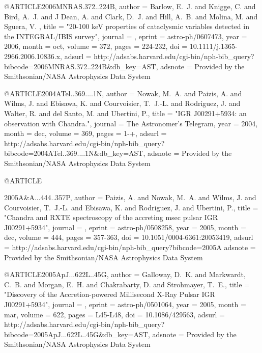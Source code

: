 {{{@ARTICLE{2006MNRAS.372..224B,
   author = {{Barlow}, E.~J. and {Knigge}, C. and {Bird}, A.~J. and {J Dean}, A. and 
	{Clark}, D.~J. and {Hill}, A.~B. and {Molina}, M. and {Sguera}, V.
	},
    title = "{20-100 keV properties of cataclysmic variables detected in the INTEGRAL/IBIS survey}",
  journal = {\mnras},
   eprint = {astro-ph/0607473},
     year = 2006,
    month = oct,
   volume = 372,
    pages = {224-232},
      doi = {10.1111/j.1365-2966.2006.10836.x},
   adsurl = {http://adsabs.harvard.edu/cgi-bin/nph-bib_query?bibcode=2006MNRAS.372..224B&db_key=AST},
  adsnote = {Provided by the Smithsonian/NASA Astrophysics Data System}
}



@ARTICLE{2004ATel..369....1N,
   author = {{Nowak}, M.~A. and {Paizis}, A. and {Wilms}, J. and {Ebisawa}, K. and 
	{Courvoisier}, T.~J.-L. and {Rodriguez}, J. and {Walter}, R. and 
	{del Santo}, M. and {Ubertini}, P.},
    title = "{IGR J00291+5934: an observation with Chandra.}",
  journal = {The Astronomer's Telegram},
     year = 2004,
    month = dec,
   volume = 369,
    pages = {1-+},
   adsurl = {http://adsabs.harvard.edu/cgi-bin/nph-bib_query?bibcode=2004ATel..369....1N&db_key=AST},
  adsnote = {Provided by the Smithsonian/NASA Astrophysics Data System}
}



@ARTICLE{2005A&A...444..357P,
   author = {{Paizis}, A. and {Nowak}, M.~A. and {Wilms}, J. and {Courvoisier}, T.~J.-L. and 
	{Ebisawa}, K. and {Rodriguez}, J. and {Ubertini}, P.},
    title = "{Chandra and RXTE spectroscopy of the accreting msec pulsar IGR J00291+5934}",
  journal = {\aap},
   eprint = {astro-ph/0508258},
     year = 2005,
    month = dec,
   volume = 444,
    pages = {357-363},
      doi = {10.1051/0004-6361:20053419},
   adsurl = {http://adsabs.harvard.edu/cgi-bin/nph-bib_query?bibcode=2005A%
  adsnote = {Provided by the Smithsonian/NASA Astrophysics Data System}
}



@ARTICLE{2005ApJ...622L..45G,
   author = {{Galloway}, D.~K. and {Markwardt}, C.~B. and {Morgan}, E.~H. and 
	{Chakrabarty}, D. and {Strohmayer}, T.~E.},
    title = "{Discovery of the Accretion-powered Millisecond X-Ray Pulsar IGR J00291+5934}",
  journal = {\apjl},
   eprint = {astro-ph/0501064},
     year = 2005,
    month = mar,
   volume = 622,
    pages = {L45-L48},
      doi = {10.1086/429563},
   adsurl = {http://adsabs.harvard.edu/cgi-bin/nph-bib_query?bibcode=2005ApJ...622L..45G&db_key=AST},
  adsnote = {Provided by the Smithsonian/NASA Astrophysics Data System}
}



}}}}

